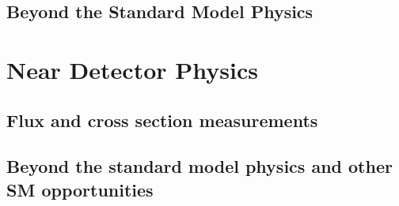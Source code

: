 \subsection{Beyond the Standard Model Physics}
\section{Near Detector Physics}
\subsection{Flux and cross section measurements}
\subsection{Beyond the standard model physics and other SM opportunities}
